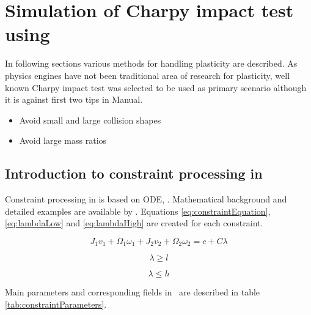 \section{Simulation of Charpy impact test using \cbullet}
\label{sec:bullet-charpy}

In following sections various methods for handling plasticity are described.
As physics engines have not been traditional area of research for plasticity, 
well known Charpy impact test was selected to be used as primary scenario
although it is against first two tips in \cbullet Manual.

\begin{itemize}
\item Avoid small and large collision shapes
\item Avoid large mass ratios
\end{itemize}

\subsection{Introduction to constraint processing in \cbullet}
Constraint processing in \cbullet is based on ODE, \cite{ode}.
Mathematical background and detailed examples are available by \cite{ode.joints}.
Equations \ref{eq:constraintEquation}, \ref{eq:lambdaLow} and
\ref{eq:lambdaHigh} 
are created for each constraint.

\begin{equation} \label{eq:constraintEquation}
J_1 v_1 + \Omega_1 \omega_1 + J_2 v_2 + \Omega_2 \omega_2 = c + C \lambda
\end{equation}

\begin{equation} \label{eq:lambdaLow}
\lambda \geq l
\end{equation}

\begin{equation} \label{eq:lambdaHigh}
\lambda \leq h
\end{equation}

Main parameters  and corresponding fields in \cbullet\  
 are described in table \ref{tab:constraintParameters}.

